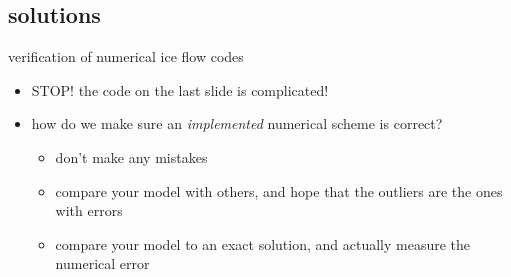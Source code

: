 \subsection{solutions}

\begin{frame}{verification of numerical ice flow codes}
\begin{itemize}
\item<1> STOP! \quad the code on the last slide is complicated!
\item<2-> how do we make sure an \emph{implemented} numerical scheme is correct?
  \begin{itemize}
  \item<3->[\emph{technique} 1] don't make any mistakes
  \item<4->[\emph{technique} 2] compare your model with others, and hope that the outliers are the ones with errors 
  \item<5>[\emph{technique} 3] compare your model to an exact solution, and actually measure the numerical error 
  \end{itemize}
\end{itemize}
\end{frame}


